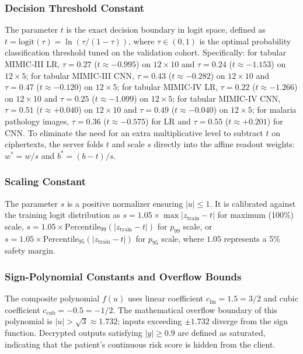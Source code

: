 \documentclass[conference]{IEEEtran}
\begin{document}
\subsubsection{Decision Threshold Constant}
The parameter $t$ is the exact decision boundary in logit space, defined as $t = \mathrm{logit}(\tau) = \ln(\tau/(1-\tau))$, where $\tau \in (0, 1)$ is the optimal probability classification threshold tuned on the validation cohort. Specifically: for tabular MIMIC-III LR, $\tau = 0.27$ ($t \approx -0.995$) on $12\times 10$ and $\tau = 0.24$ ($t \approx -1.153$) on $12\times 5$; for tabular MIMIC-III CNN, $\tau = 0.43$ ($t \approx -0.282$) on $12\times 10$ and $\tau = 0.47$ ($t \approx -0.120$) on $12\times 5$; for tabular MIMIC-IV LR, $\tau = 0.22$ ($t \approx -1.266$) on $12\times 10$ and $\tau = 0.25$ ($t \approx -1.099$) on $12\times 5$; for tabular MIMIC-IV CNN, $\tau = 0.51$ ($t \approx +0.040$) on $12\times 10$ and $\tau = 0.49$ ($t \approx -0.040$) on $12\times 5$; for malaria pathology images, $\tau = 0.36$ ($t \approx -0.575$) for LR and $\tau = 0.55$ ($t \approx +0.201$) for CNN. To eliminate the need for an extra multiplicative level to subtract $t$ on ciphertexts, the server folds $t$ and scale $s$ directly into the affine readout weights: $w^* = w/s$ and $b^* = (b - t)/s$.

\subsubsection{Scaling Constant}
The parameter $s$ is a positive normalizer ensuring $|u| \leq 1$. It is calibrated against the training logit distribution as $s = 1.05 \times \max|z_{\mathrm{train}} - t|$ for maximum (100\%) scale, $s = 1.05 \times \mathrm{Percentile}_{99}(|z_{\mathrm{train}} - t|)$ for $p_{99}$ scale, or $s = 1.05 \times \mathrm{Percentile}_{95}(|z_{\mathrm{train}} - t|)$ for $p_{95}$ scale, where $1.05$ represents a 5\% safety margin.

\subsubsection{Sign-Polynomial Constants and Overflow Bounds}
The composite polynomial $f(u)$ uses linear coefficient $c_{\mathrm{lin}} = 1.5 = 3/2$ and cubic coefficient $c_{\mathrm{cub}} = -0.5 = -1/2$. The mathematical overflow boundary of this polynomial is $|u| > \sqrt{3} \approx 1.732$; inputs exceeding $\pm 1.732$ diverge from the sign function. Decrypted outputs satisfying $|y| \geq 0.9$ are defined as saturated, indicating that the patient's continuous risk score is hidden from the client.
\end{document}
